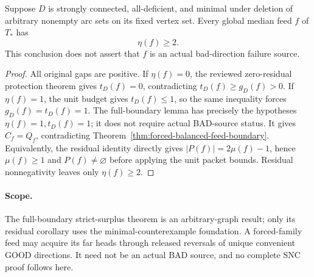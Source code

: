 \begin{corollary}
\label{cor:forced-feed-residual-at-least-two}
Suppose $D$ is strongly connected, all-deficient, and minimal under
deletion of arbitrary nonempty arc sets on its fixed vertex set.
Every global median feed $f$ of $T_*$ has
\[
 \eta(f)\ge2.
\]
This conclusion does not assert that $f$ is an actual bad-direction
failure source.
\end{corollary}
\begin{proof}
All original gaps are positive. If $\eta(f)=0$, the reviewed
zero-residual protection theorem gives $t_D(f)=0$, contradicting
$t_D(f)\ge g_D(f)>0$.
If $\eta(f)=1$, the unit budget gives $t_D(f)\le1$, so the same
inequality forces $g_D(f)=t_D(f)=1$. The full-boundary
lemma has precisely the hypotheses $\eta(f)=1,t_D(f)=1$;
it does not require actual BAD-source status. It gives $C_f=Q_f$,
contradicting Theorem~\ref{thm:forced-balanced-feed-boundary}.
Equivalently, the residual identity directly gives
$|P(f)|=2\mu(f)-1$, hence $\mu(f)\ge1$ and $P(f)\ne\varnothing$
before applying the unit packet bounds. Residual nonnegativity leaves
only $\eta(f)\ge2$.
\end{proof}

\paragraph{Scope.}
The full-boundary strict-surplus theorem is an arbitrary-graph result;
only its residual corollary uses the minimal-counterexample
foundation. A forced-family feed may acquire its far heads through
released reversals of unique convenient GOOD directions. It need not
be an actual BAD source, and no complete SNC proof follows here.
